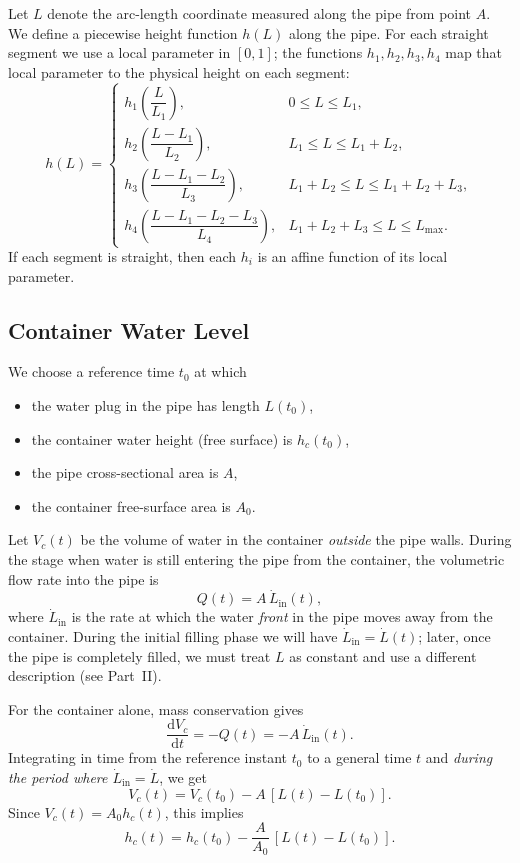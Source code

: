 \documentclass[11pt]{article}
\begin{document}
Let $L$ denote the arc-length coordinate measured along the pipe from point $A$.
We define a piecewise height function $h(L)$ along the pipe. For each straight
segment we use a local parameter in $[0, 1]$; the functions $h_1, h_2,
h_3, h_4$ map that local parameter to the physical height on each
segment:
\[
h(L) =
\begin{cases}
 h_1\!\left(\dfrac{L}{L_1}\right), & 0 \le L \le L_1, \\[1.0em]
 h_2\!\left(\dfrac{L - L_1}{L_2}\right), & L_1 \le L \le L_1 + L_2, \\[1.0em]
 h_3\!\left(\dfrac{L - L_1 - L_2}{L_3}\right), & L_1 + L_2 \le L \le L_1 + L_2 + L_3, \\[1.0em]
 h_4\!\left(\dfrac{L - L_1 - L_2 - L_3}{L_4}\right), & L_1 + L_2 + L_3 \le L \le L_{\max}.
\end{cases}
\]
If each segment is straight, then each $h_i$ is an affine function of its local
parameter.

\subsection{Container Water Level}

We choose a reference time $t_0$ at which
\begin{itemize}
  \item the water plug in the pipe has length $L(t_0)$,
  \item the container water height (free surface) is $h_c(t_0)$,
  \item the pipe cross-sectional area is $A$,
  \item the container free-surface area is $A_0$.
\end{itemize}

Let $V_c(t)$ be the volume of water in the container \emph{outside} the pipe walls.
During the stage when water is still entering the pipe from the container, the
volumetric flow rate into the pipe is
\[
Q(t) = A\,\dot L_{\text{in}}(t),
\]
where $\dot L_{\text{in}}$ is the rate at which the water \emph{front} in the pipe
moves away from the container. During the initial filling phase we will have
$\dot L_{\text{in}} = \dot L(t)$; later, once the pipe is completely filled, we
must treat $L$ as constant and use a different description (see Part~II).

For the container alone, mass conservation gives
\[
\frac{\mathrm{d}V_c}{\mathrm{d}t} = -Q(t) = -A\,\dot L_{\text{in}}(t).
\]
Integrating in time from the reference instant $t_0$ to a general time $t$ and
\emph{during the period where $\dot L_{\text{in}}=\dot L$}, we get
\[
V_c(t) = V_c(t_0) - A\,[L(t)-L(t_0)].
\]
Since $V_c(t) = A_0 h_c(t)$, this implies
\begin{equation}
  h_c(t) = h_c(t_0) - \frac{A}{A_0}\,[L(t)-L(t_0)].
  \label{eq:hc-general}
\end{equation}
\end{document}
